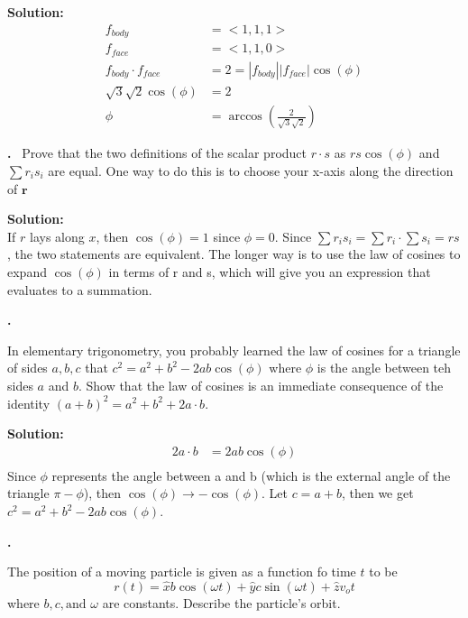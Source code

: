 \documentclass{article}
\newcounter{problem}
\newcounter{solution}
\newcommand\Problem{%
  \stepcounter{problem}%
  \textbf{\theproblem.}~%
  \setcounter{solution}{0}%
}
\newcommand\TheSolution{%
  \textbf{Solution:}\\%
}
\begin{document}
\TheSolution
\begin{equation}
    \begin{aligned}
        f_{body}                & = <1,1,1>                            \\
        f_{face}                & = <1,1,0>                            \\
        f_{body} \cdot f_{face} & = 2 = |f_{body}||f_{face}|\cos(\phi) \\
        \sqrt3\sqrt2\cos(\phi)  & = 2                                  \\
        \phi                    & = \arccos(\frac{2}{\sqrt3\sqrt2})
    \end{aligned}
\end{equation}
\begin{center}
    \boxed{35.26\deg}
\end{center}

\Problem Prove that the two definitions of the scalar product $r \cdot s$ as $rs\cos(\phi)$ and $\sum r_i s_i$ are equal. One way to do this is to choose your x-axis along the direction of $\boldsymbol{r}$

\TheSolution
If $r$ lays along $x$, then $\cos(\phi) = 1$ since $\phi = 0$. Since $\sum r_i s_i = \sum r_i \cdot \sum s_i = rs$, the two statements are equivalent. The longer way is to use the law of cosines to expand $\cos(\phi)$ in terms of r and s, which will give you an expression that evaluates to a summation.

\Problem
In elementary trigonometry, you probably learned the law of cosines for a triangle of sides $a, b, c$ that $c^2 = a^2 + b^2 - 2ab\cos(\phi)$ where $\phi$ is the angle between teh sides $a$ and $b$. Show that the law of cosines is an immediate consequence of the identity $(a + b)^2 = a^2 + b^2 + 2 a \cdot b$.

\TheSolution
\begin{equation}
    \begin{aligned}
        2a \cdot b & = 2ab\cos(\phi) \\
    \end{aligned}
\end{equation}
Since $\phi$ represents the angle between a and b (which is the external angle of the triangle $\pi - \phi$), then $\cos(\phi) \rightarrow -\cos(\phi)$. Let $c = a + b$, then we get $c^2 = a^2 + b^2 - 2ab\cos(\phi)$.

\Problem
The position of a moving particle is given as a function fo time $t$ to be
\[r(t) = \hat{x}b\cos(\omega t) + \hat{y}c\sin(\omega t) + \hat{z}v_o t\]
where $b, c, \text{and } \omega$ are constants. Describe the particle's orbit.
\end{document}
